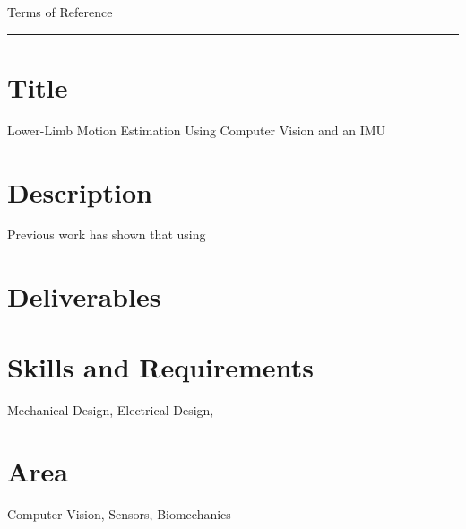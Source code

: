 
{\Large Terms of Reference}
\\
\hrule

\section*{Title}
  Lower-Limb Motion Estimation Using Computer Vision and an IMU
  
\section*{Description}
Previous work has shown that using 
  
\section*{Deliverables}

  
\section*{Skills and Requirements}
  Mechanical Design, Electrical Design,  
  
\section*{Area}
  Computer Vision, Sensors, Biomechanics
 
